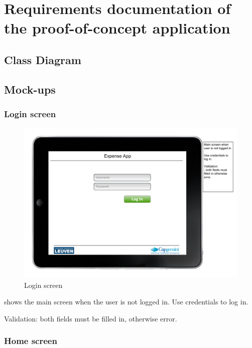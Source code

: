 \chapter{Requirements documentation of the proof-of-concept application}
\label{app:poc}

\section{Class Diagram}

\section{Mock-ups}

\subsection{Login screen}

\begin{figure}[h!]
    \includegraphics[width=\textwidth]{figs/poc/login-screen.pdf}
    \caption{Login screen}
    \label{fig:app-login-screen}
\end{figure}

 shows the main screen when the user is not logged in. Use credentials to log in.

Validation: both fields must be filled in, otherwise error.

\subsection{Home screen}


